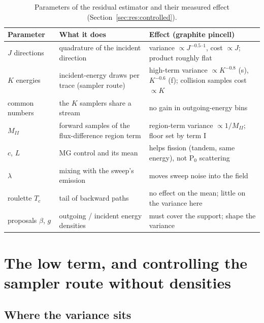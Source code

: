 \begin{table}[t]\centering\small
\begin{tabularx}{\textwidth}{>{\raggedright}p{3.0cm}>{\raggedright}p{4.2cm}X}
\toprule
Parameter & What it does & Effect (graphite pincell)\\
\midrule
$J$ directions & quadrature of the incident direction & variance $\propto J^{-0.5\text{--}1}$, cost $\propto J$; product roughly flat\\
$K$ energies & incident-energy draws per trace (sampler route) & high-term variance $\propto K^{-0.8}$ (s), $K^{-0.6}$ (f); collision samples cost $\propto K$\\
common numbers & the $K$ samplers share a stream & no gain in outgoing-energy bins\\
$M_{II}$ & forward samples of the flux-difference region term & region-term variance $\propto 1/M_{II}$; floor set by term I\\
$c$, $L$ & MG control and its mean & helps fission (tandem, same energy), not P$_0$ scattering\\
$\lambda$ & mixing with the sweep's emission & moves sweep noise into the field\\
roulette $T_c$ & tail of backward paths & no effect on the mean; little on the variance here\\
proposals $\beta$, $g$ & outgoing / incident energy densities & must cover the support; shape the variance\\
\bottomrule
\end{tabularx}
\caption{Parameters of the residual estimator and their measured effect
(Section~\ref{sec:res:controlled}).}\label{tab:params}
\end{table}

\section{The low term, and controlling the sampler route without densities}\label{sec:lowterm}

\subsection{Where the variance sits}

